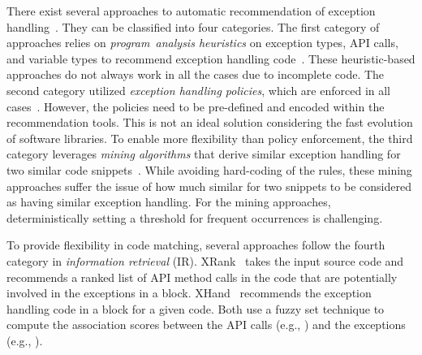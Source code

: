There exist several approaches to automatic recommendation of
exception
handling~\cite{barbosa-bsse12,chanchal-scam14,barbosa-tse18,barbosa-tse16,xrank-fse20,throw-ase22}. They
can be classified into four categories. The first category of
approaches relies on {\em program~analysis heuristics} on
exception types, API calls, and variable types to recommend exception
handling code~\cite{barbosa-bsse12}. These heuristic-based approaches
do not always work in all the cases due to incomplete code. The second
category utilized {\em exception handling policies}, which are
enforced in all cases~\cite{barbosa-tse16,barbosa-saner18}. However,
the policies need to be pre-defined and encoded within the
recommendation tools.  This is not an ideal solution considering the
fast evolution of software libraries. To enable more flexibility than
policy enforcement, the third category leverages {\em mining
  algorithms} that derive similar exception handling for two similar
code snippets~\cite{chanchal-scam14}. While avoiding hard-coding of
the rules, these mining approaches suffer the issue of how much
similar for two snippets to be considered as having similar exception
handling. For the mining approaches, deterministically setting a
threshold for frequent occurrences is challenging.


To provide flexibility in code matching, several approaches follow the fourth category in {\em information retrieval}
(IR). XRank~\cite{xrank-fse20} takes the input
source code and recommends a ranked list of API method calls in the
code that are potentially involved in the exceptions in a 
block. XHand~\cite{xrank-fse20} recommends the exception handling
code in a  block for a given code. Both use a fuzzy set
technique to compute the association scores between the API calls (e.g.,
) and the exceptions (e.g.,
).

